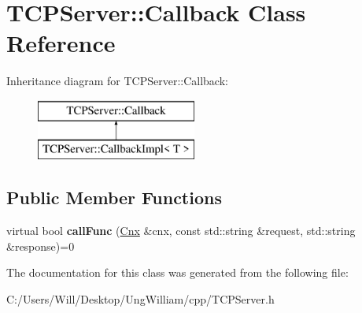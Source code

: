 \hypertarget{class_t_c_p_server_1_1_callback}{}\section{T\+C\+P\+Server\+:\+:Callback Class Reference}
\label{class_t_c_p_server_1_1_callback}
Inheritance diagram for T\+C\+P\+Server\+:\+:Callback\+:\begin{figure}[H]
\begin{center}
\leavevmode
\includegraphics[height=2.000000cm]{class_t_c_p_server_1_1_callback}
\end{center}
\end{figure}
\subsection*{Public Member Functions}
\begin{DoxyCompactItemize}
\item 
virtual bool {\bfseries call\+Func} (\hyperlink{class_t_c_p_server_1_1_cnx}{Cnx} \&cnx, const std\+::string \&request, std\+::string \&response)=0\hypertarget{class_t_c_p_server_1_1_callback_a0d26469a5cfb3f5f0b3529cacb5d1615}{}\label{class_t_c_p_server_1_1_callback_a0d26469a5cfb3f5f0b3529cacb5d1615}

\end{DoxyCompactItemize}


The documentation for this class was generated from the following file\+:\begin{DoxyCompactItemize}
\item 
C\+:/\+Users/\+Will/\+Desktop/\+Ung\+William/cpp/T\+C\+P\+Server.\+h\end{DoxyCompactItemize}
